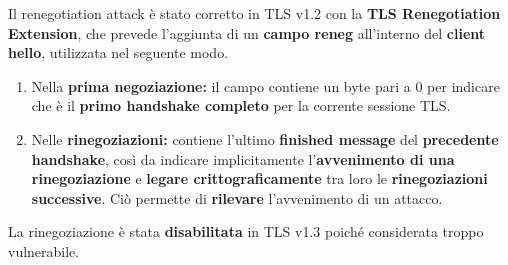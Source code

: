 Il renegotiation attack è stato corretto in TLS v1.2 con la \textbf{TLS Renegotiation Extension}, che prevede l'aggiunta di un \textbf{campo reneg} all'interno del \textbf{client hello}, utilizzata nel seguente modo.
\begin{enumerate}
    \item Nella \textbf{prima negoziazione:} il campo contiene un byte pari a 0 per indicare che è il \textbf{primo handshake completo} per la corrente sessione TLS.
    \item Nelle \textbf{rinegoziazioni:} contiene l'ultimo \textbf{finished message} del \textbf{precedente handshake}, così da indicare implicitamente l'\textbf{avvenimento di una rinegoziazione} e \textbf{legare crittograficamente} tra loro le \textbf{rinegoziazioni successive}. Ciò permette di \textbf{rilevare} l'avvenimento di un attacco.
\end{enumerate}
\begin{remark}
La rinegoziazione è stata \textbf{disabilitata} in TLS v1.3 poiché considerata troppo vulnerabile.
\end{remark}
